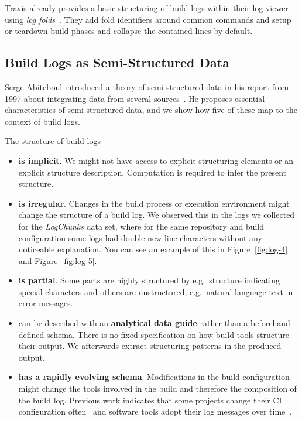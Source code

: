 \documentclass[\myrootdir/main.tex]{subfiles}
\begin{document}
Travis already provides a basic structuring of build logs within their log viewer using \emph{log folds}~\cite{travis2019logfolds}.
They add fold identifiers around common commands and setup or teardown build phases and collapse the contained lines by default.

\subsection{Build Logs as Semi-Structured Data}
\label{sec:rw-semi-structured-data}
Serge Abiteboul introduced a theory of semi-structured data in his report from 1997 about integrating data from several sources~\cite{abiteboul1997querying}.
He proposes essential characteristics of semi-structured data, and we show how five of these map to the context of build logs.

The structure of build logs
\begin{itemize}
  \item \textbf{is implicit}.
  We might not have access to explicit structuring elements or an explicit structure description.
  Computation is required to infer the present structure.
  \item \textbf{is irregular}.
  Changes in the build process or execution environment might change the structure of a build log.
  We observed this in the logs we collected for the \emph{LogChunks} data set, where for the same repository and build configuration some logs had double new line characters without any noticeable explanation.
  You can see an example of this in Figure~\ref{fig:log-4} and Figure~\ref{fig:log-5}.
  \item \textbf{is partial}. Some parts are highly structured by e.g.\ structure indicating special characters and others are unstructured, e.g.\ natural language text in error messages.
  \item can be described with an \textbf{analytical data guide} rather than a beforehand defined schema.
  There is no fixed specification on how build tools structure their output.
  We afterwards extract structuring patterns in the produced output.
  \item \textbf{has a rapidly evolving schema}.
  Modifications in the build configuration might change the tools involved in the build and therefore the composition of the build log.
  Previous work indicates that some projects change their CI configuration often~\cite{hilton2016usage} and software tools adopt their log messages over time~\cite{yuan2012characterizing}.
\end{itemize}
\end{document}
